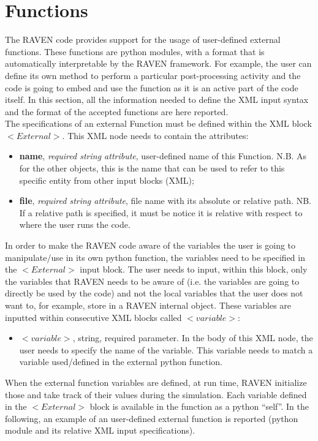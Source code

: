 \section{Functions  \\ \vspace{2 mm} {\small }}
\label{sec:functions}
The RAVEN code provides support for the usage of user-defined external functions. These functions are python modules, with a format that is automatically interpretable by the RAVEN framework. 	For example, the user can define its own method to perform a particular post-processing activity and the code is going to embed and use the function as it is an active part of the code itself. In this section, all the information needed to define the XML input syntax and the format of the accepted functions are here reported.
\\ The specifications of an external Function must be defined within the XML block $<External>$. This XML node needs to contain the attributes:
\vspace{-5mm}
\begin{itemize}
\itemsep0em
\item \textbf{name}, \textit{required string attribute}, user-defined name of this Function. N.B. As for the other objects, this is the name that can be used to refer to this specific entity from other input blocks (XML);
\item \textbf{file}, \textit{required string attribute}, file name with its absolute or relative path. NB. If a relative path is specified, it must be notice it is relative with respect to where the user runs the code.
\end{itemize}
\vspace{-5mm}
In order to make the RAVEN code aware of the variables the user is going to manipulate/use in its own python function, the variables need to be specified in the \textbf{$<External>$} input block. The user needs to input, within this block, only the variables that RAVEN needs to be aware of (i.e. the variables are going to directly be used by the code) and not the local variables that the user does not want to, for example, store in a RAVEN internal object. These variables are inputted within consecutive XML blocks called $<variable>$:
\begin{itemize}
\item $<variable>$, string, required parameter. In the body of this XML node, the user needs to specify the name of the variable. This variable needs to match a variable used/defined in the external python function.
\end{itemize}
When the external function variables are defined, at run time, RAVEN initialize those and take track of their values during the simulation. Each variable defined in the $<External>$ block is available in the function as a python ``self''. In the following, an example of an user-defined external function is reported (python module and its relative XML input specifications).

